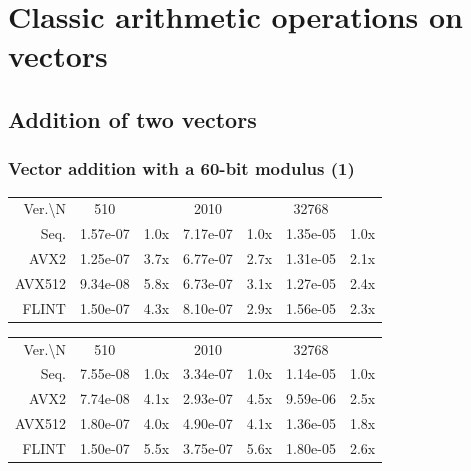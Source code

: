 \documentclass[10pt]{beamer}
\begin{document}
\section{Classic arithmetic operations on vectors}
\subsection{Addition of two vectors}
\begin{frame}
    \frametitle{Vector addition with a 60-bit modulus (1)}

    \begin{table}[h!]
        \centering
        
        \begin{tabular}{|r|*{3}{c c|}}
            \hline
            \rowcolor{myGray} 
            \multicolumn{7}{|c|}{\textsc{Cascade Lake}} \\
            \hline
            \rowcolor{myGray}
            Ver.\textbackslash N & 510 & & 2010 & & 32768 & \\
            \hline
            \cellcolor{myGray} Seq. & 1.57e-07 & 1.0x & 7.17e-07 & 1.0x & 1.35e-05 & 1.0x \\
            \hline
            \cellcolor{myGray} AVX2 & 1.25e-07 & 3.7x & 6.77e-07 & 2.7x & 1.31e-05 & 2.1x \\
            \hline
            \cellcolor{myGray} AVX512 & 9.34e-08 & 5.8x & 6.73e-07 & 3.1x & 1.27e-05 & 2.4x \\
            \hline
            \cellcolor{myGray} FLINT & 1.50e-07 & 4.3x & 8.10e-07 & 2.9x & 1.56e-05 & 2.3x \\
            \hline
        \end{tabular}
    
        \begin{tabular}{|r|*{3}{c c|}}
            \hline
            \rowcolor{myGray} 
            \multicolumn{7}{|c|}{\textsc{Ice Lake}} \\
            \hline
            \rowcolor{myGray}
            Ver.\textbackslash N & 510 & & 2010 & & 32768 & \\
            \hline
            \cellcolor{myGray} Seq. & 7.55e-08 & 1.0x & 3.34e-07 & 1.0x & 1.14e-05 & 1.0x \\
            \hline
            \cellcolor{myGray} AVX2 & 7.74e-08 & 4.1x & 2.93e-07 & 4.5x & 9.59e-06 & 2.5x \\
            \hline
            \cellcolor{myGray} AVX512 & 1.80e-07 & 4.0x & 4.90e-07 & 4.1x & 1.36e-05 & 1.8x \\
            \hline
            \cellcolor{myGray} FLINT & 1.50e-07 & 5.5x & 3.75e-07 & 5.6x & 1.80e-05 & 2.6x \\
            \hline
        \end{tabular}
    

\end{table}
\end{frame}
\end{document}
